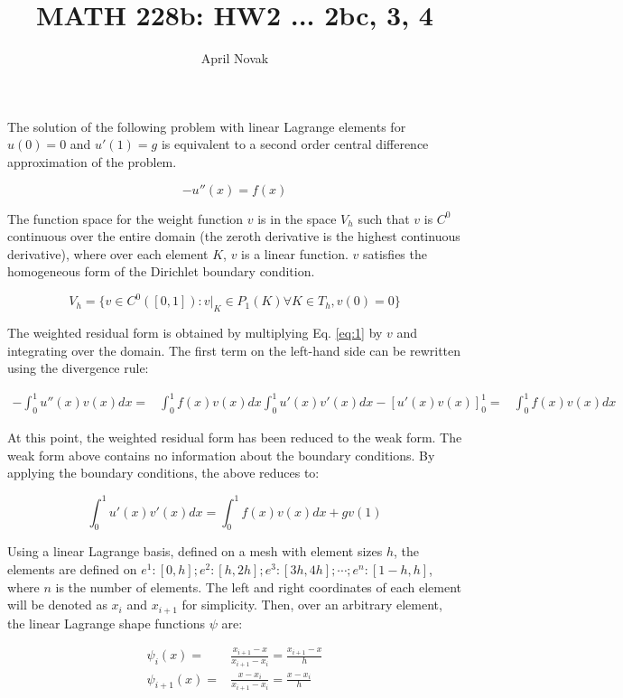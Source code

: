 \documentclass[10pt]{article}
\newcommand{\beq}{\begin{equation}}
\newcommand{\eeq}{\end{equation}}
\newcommand{\beqa}{\begin{equation}\begin{aligned}}
\newcommand{\eeqa}{\end{aligned}\end{equation}}
\begin{document}
\title{MATH 228b: HW2 ... 2bc, 3, 4}
\author{April Novak}

\maketitle

\section{} 

The solution of the following problem with linear Lagrange elements for \(u(0)=0\) and \(u'(1)=g\) is equivalent to a second order central difference approximation of the problem. 

\beq
\label{eq:1}
-u''(x)=f(x)
\eeq

The function space for the weight function \(v\) is in the space \(V_h\) such that \(v\) is \(C^0\) continuous over the entire domain (the zeroth derivative is the highest continuous derivative), where over each element \(K\), \(v\) is a linear function. \(v\) satisfies the homogeneous form of the Dirichlet boundary condition.

\beq
V_h=\{v\in C^0([0,1]): v\rvert_K\in P_1(K) \forall K\in T_h, v(0)=0\}
\eeq

The weighted residual form is obtained by multiplying Eq. \eqref{eq:1} by \(v\) and integrating over the domain. The first term on the left-hand side can be rewritten using the divergence rule:

\beqa
-\int_0^1 u''(x)v(x)dx=& \int_0^1 f(x)v(x)dx
\int_0^1 u'(x)v'(x)dx-\left\lbrack u'(x)v(x)\right\rbrack_0^1=& \int_0^1 f(x)v(x)dx
\eeqa

At this point, the weighted residual form has been reduced to the weak form. The weak form above contains no information about the boundary conditions. By applying the boundary conditions, the above reduces to:

\beq
\int_0^1 u'(x)v'(x)dx=\int_0^1 f(x)v(x)dx+gv(1)
\eeq

Using a linear Lagrange basis, defined on a mesh with element sizes \(h\), the elements are defined on \(e^1: [0, h]; e^2: [h, 2h]; e^3: [3h, 4h]; \cdots; e^n: [1-h, h]\), where \(n\) is the number of elements. The left and right coordinates of each element will be denoted as \(x_i\) and \(x_{i+1}\) for simplicity. Then, over an arbitrary element, the linear Lagrange shape functions \(\psi\) are:

\beqa
\psi_i(x)=& \frac{x_{i+1}-x}{x_{i+1}-x_i}=\frac{x_{i+1}-x}{h}\\
\psi_{i+1}(x) =& \frac{x-x_i}{x_{i+1}-x_i}=\frac{x-x_i}{h}\\
\eeqa
\end{document}
